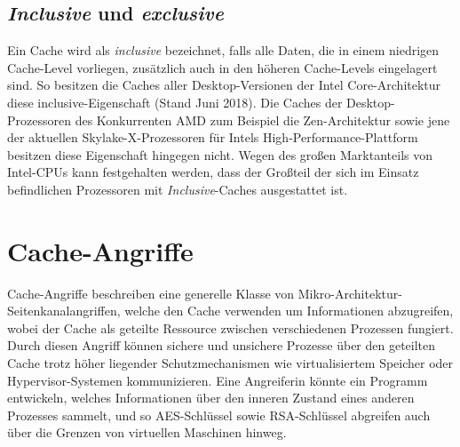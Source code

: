 
\subsection{\textit{Inclusive} und \textit{exclusive}}
Ein Cache wird als \textit{inclusive} bezeichnet, falls alle Daten, die in einem niedrigen Cache-Level vorliegen, zusätzlich auch in den höheren Cache-Levels eingelagert sind. 
So besitzen die Caches aller Desktop-Versionen der Intel Core-Architektur diese inclusive-Eigenschaft (Stand Juni 2018).
Die Caches der Desktop-Prozessoren des Konkurrenten AMD zum Beispiel die Zen-Architektur \cite{CacheRyzen} sowie jene der aktuellen Skylake-X-Prozessoren \cite{CacheSkylakeX} für Intels High-Performance-Plattform besitzen diese Eigenschaft hingegen nicht.
Wegen des großen Marktanteils von Intel-CPUs kann festgehalten werden, dass der Großteil der sich im Einsatz befindlichen Prozessoren mit \textit{Inclusive}-Caches ausgestattet ist.

\section{Cache-Angriffe}

Cache-Angriffe beschreiben eine generelle Klasse von Mikro-Architektur-Seitenkanalangriffen, welche den Cache verwenden um Informationen abzugreifen, wobei der Cache als geteilte Ressource zwischen verschiedenen Prozessen fungiert. Durch diesen Angriff können sichere und unsichere Prozesse über den geteilten Cache trotz höher liegender Schutzmechanismen wie virtualisiertem Speicher oder Hypervisor-Systemen kommunizieren. 
Eine Angreiferin könnte ein Programm entwickeln, welches Informationen über den inneren Zustand eines anderen Prozesses sammelt, und so AES-Schlüssel \cite{BernsteinAES} sowie RSA-Schlüssel \cite{CacheAttackRSA} abgreifen auch über die Grenzen von virtuellen Maschinen hinweg.


